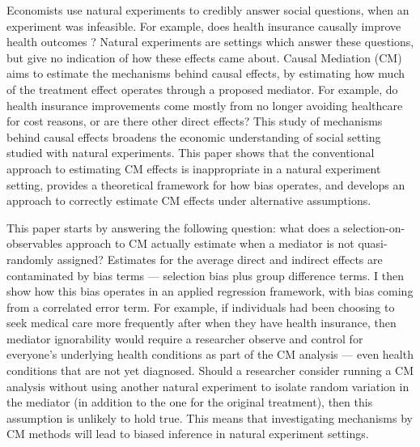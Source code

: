 Economists use natural experiments to credibly answer social questions, when an experiment was infeasible.
For example, does health insurance causally improve health outcomes \citep{finkelstein2008oregon}?
Natural experiments are settings which answer these questions, but give no indication of how these effects came about.
Causal Mediation (CM) aims to estimate the mechanisms behind causal effects, by estimating how much of the treatment effect operates through a proposed mediator.
For example, do health insurance improvements come mostly from no longer avoiding healthcare for cost reasons, or are there other direct effects?
This study of mechanisms behind causal effects broadens the economic understanding
of social setting studied with natural experiments.
This paper shows that the conventional approach to estimating CM effects is inappropriate in a natural experiment setting, provides a theoretical framework for how bias operates, and develops an approach to correctly estimate CM effects under alternative assumptions.


This paper starts by answering the following question: what does a selection-on-observables approach to CM actually estimate when a mediator is not quasi-randomly assigned?
Estimates for the average direct and indirect effects are contaminated by bias terms --- selection bias plus group difference terms.
I then show how this bias operates in an applied regression framework, with bias coming from a correlated error term.
For example, if individuals had been choosing to seek medical care more frequently after when they have health insurance, then mediator ignorability would require a researcher observe and control for everyone's underlying health conditions as part of the CM analysis --- even health conditions that are not yet diagnosed.
Should a researcher consider running a CM analysis without using another natural experiment to isolate random variation in the mediator (in addition to the one for the original treatment), then this assumption is unlikely to hold true.
This means that investigating mechanisms by CM methods will lead to biased inference in natural experiment settings.

